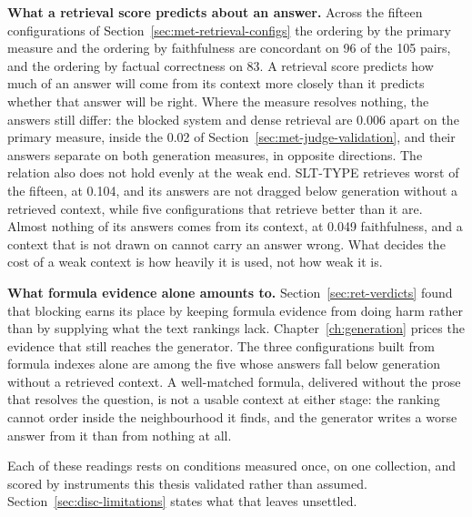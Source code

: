 \textbf{What a retrieval score predicts about an answer.} Across the fifteen configurations of
Section~\ref{sec:met-retrieval-configs} the ordering by the primary measure and the ordering by
faithfulness are concordant on 96 of the 105 pairs, and the ordering by factual correctness on 83.
A retrieval score predicts how much of an answer will come from its context more closely than it
predicts whether that answer will be right. Where the measure resolves nothing, the answers still
differ: the blocked system and dense retrieval are 0.006 apart on the primary measure, inside the
0.02 of Section~\ref{sec:met-judge-validation}, and their answers separate on both generation
measures, in opposite directions. The relation also does not hold evenly at the weak end. SLT-TYPE
retrieves worst of the fifteen, at 0.104, and its answers are not dragged below generation without
a retrieved context, while five configurations that retrieve better than it are. Almost nothing of
its answers comes from its context, at 0.049 faithfulness, and a context that is not drawn on
cannot carry an answer wrong. What decides the cost of a weak context is how heavily it is used,
not how weak it is.

\textbf{What formula evidence alone amounts to.} Section~\ref{sec:ret-verdicts} found that blocking
earns its place by keeping formula evidence from doing harm rather than by supplying what the text
rankings lack. Chapter~\ref{ch:generation} prices the evidence that still reaches the generator. The
three configurations built from formula indexes alone are among the five whose answers fall below
generation without a retrieved context. A well-matched formula, delivered without the prose that
resolves the question, is not a usable context at either stage: the ranking cannot order inside the
neighbourhood it finds, and the generator writes a worse answer from it than from nothing at all.

Each of these readings rests on conditions measured once, on one collection, and scored by
instruments this thesis validated rather than assumed. Section~\ref{sec:disc-limitations} states what that
leaves unsettled.

